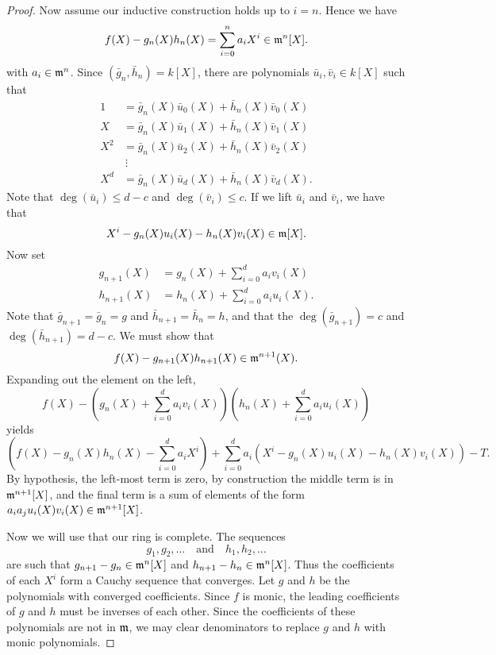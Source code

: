 \documentclass{ximera}
\begin{document}
\begin{theorem}
\begin{proof}
    Now assume our inductive construction holds up to $i=n$. Hence we have
    \[
    f(X) - g_n(X) h_n(X) = \sum_{i=0}^n a_i X^i\in \mathfrak{m}^n[X].
    \]
    with $a_i\in \mathfrak{m}^n$.  Since $(\bar{g}_n, \bar{h}_n) = k[X]$, there
    are polynomials $\bar{u}_i,\bar{v}_i\in k[X]$ such that
    \begin{align*}
      1  &= \bar{g}_n(X)\bar{u}_0(X) + \bar{h}_n(X)\bar{v}_0(X) \\
      X  &= \bar{g}_n(X)\bar{u}_1(X) + \bar{h}_n(X)\bar{v}_1(X) \\
      X^2  &= \bar{g}_n(X)\bar{u}_2(X) + \bar{h}_n(X)\bar{v}_2(X) \\
      &\ \vdots\\
      X^d  &= \bar{g}_n(X)\bar{u}_d(X) + \bar{h}_n(X)\bar{v}_d(X).
    \end{align*}
    Note that $\deg(\bar{u}_i) \le d-c$ and $\deg(\bar{v}_i) \le
    c$. If we lift $\bar{u}_i$ and $\bar{v}_i$, we have that
    \[
    X^i - g_n(X) u_i(X) - h_n(X) v_i(X) \in \mathfrak{m}[X]. 
    \]
    Now set
    \begin{align*}
      g_{n+1}(X) &= g_n(X) + \sum_{i=0}^d a_i v_i(X)\\
      h_{n+1}(X) &= h_n(X) + \sum_{i=0}^d a_i u_i(X).
    \end{align*}
    Note that $\bar{g}_{n+1} = \bar{g}_n = g$ and $\bar{h}_{n+1} =
    \bar{h}_n = h$, and that the $\deg(\bar{g}_{n+1}) = c$ and
    $\deg(\bar{h}_{n+1}) = d-c$. We must show that
    \[
    f(X) - g_{n+1}(X) h_{n+1}(X) \in \mathfrak{m}^{n+1}(X).
    \]
    Expanding out the element on the left,
    \[
    f(X) - \left(g_n(X) + \sum_{i=0}^d a_i v_i(X)\right)\left(h_n(X) + \sum_{i=0}^d a_i u_i(X)\right)
    \]
    yields
    \[
    \left(f(X) - g_n(X)h_n(X) - \sum_{i=0}^d a_i X^i\right) + \sum_{i=0}^d a_i(X^i - g_n(X) u_i(X) - h_n(X) v_i(X)) - T.
    \]
    By hypothesis, the left-most term is zero, by construction the
    middle term is in $\mathfrak{m}^{n+1}[X]$, and the final term is a sum of
    elements of the form $a_ia_ju_i(X)v_i(X)\in\mathfrak{m}^{n+1}[X]$.

    Now we will use that our ring is complete. The sequences
    \[
    g_1,g_2,\dots \quad\text{and}\quad h_1,h_2,\dots
    \]
    are such that $g_{n+1}-g_n\in \mathfrak{m}^n[X]$ and $h_{n+1}-h_n\in
    \mathfrak{m}^n[X]$. Thus the coefficients of each $X^i$ form a Cauchy
    sequence that converges. Let $g$ and $h$ be the polynomials with
    converged coefficients. Since $f$ is monic, the leading
    coefficients of $g$ and $h$ must be inverses of each other. Since
    the coefficients of these polynomials are not in $\mathfrak{m}$, we may
    clear denominators to replace $g$ and $h$ with monic polynomials.
  \end{proof}
\end{theorem}
\end{document}
